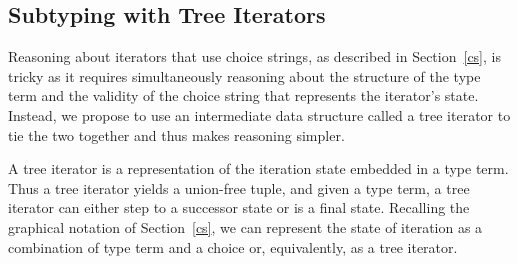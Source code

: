 \documentclass[a4paper,english]{lipics-v2019}
\begin{document}
\subsection{Subtyping with Tree Iterators}

Reasoning about iterators that use choice strings, as described in
Section~\ref{cs}, is tricky as it requires simultaneously reasoning about
the structure of the type term and the validity of the choice string that
represents the iterator's state. Instead, we propose to use an intermediate
data structure called a tree iterator to tie the two together and thus makes
reasoning simpler.

A tree iterator is a representation of the iteration state embedded in a
type term. Thus a tree iterator yields a union-free tuple, and given a type
term, a tree iterator can either step to a successor state or is a final
state. Recalling the graphical notation of Section~\ref{cs}, we can
represent the state of iteration as a combination of type term and a choice
or, equivalently, as a tree iterator.
\end{document}
